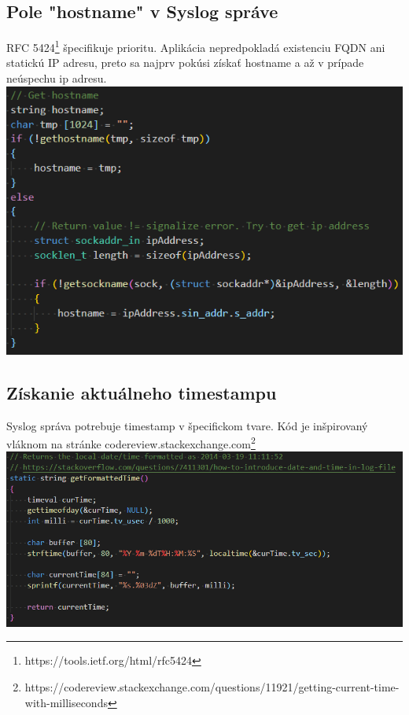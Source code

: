 \documentclass{article}
\begin{document}
        \subsection{Pole "hostname" v Syslog správe}
        RFC 5424\footnote{https://tools.ietf.org/html/rfc5424} špecifikuje prioritu. Aplikácia nepredpokladá existenciu FQDN ani statickú IP adresu, preto
        sa najprv pokúsi získať hostname a až v prípade neúspechu ip adresu.
        \includegraphics {hostname.png}

        \subsection{Získanie aktuálneho timestampu}
        Syslog správa potrebuje timestamp v špecifickom tvare. Kód je inšpirovaný vláknom na stránke
        codereview.stackexchange.com\footnote{https://codereview.stackexchange.com/questions/11921/getting-current-time-with-milliseconds}
        \includegraphics {timestamp.png}
\end{document}
